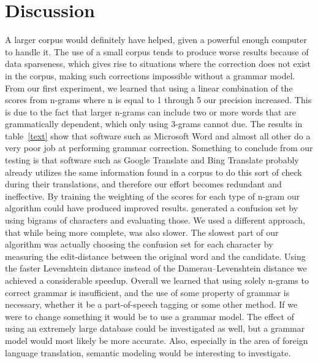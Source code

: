 \documentclass[twocolumn]{article}
\begin{document}
\section{Discussion}
A larger corpus would definitely have helped, given a powerful enough computer to handle it. The use of a small corpus tends to produce worse results because of data sparseness, which gives rise to situations where the correction does not exist in the corpus, making such corrections impossible without a grammar model. From our first experiment, we learned that using a linear combination of the scores from n-grams where n is equal to 1 through 5 our precision increased. This is due to the fact that larger n-grams can include two or more words that are grammatically dependent, which only using 3-grams cannot due. 
The results in table~\ref{text} show that software such as Microsoft Word and almost all other do a very poor job at performing grammar correction.
Something to conclude from our testing is that software such as Google Translate and Bing Translate probably already utilizes the same information found in a corpus to do this sort of check during their translations, and therefore our effort becomes redundant and ineffective.
By training the weighting of the scores for each type of n-gram our algorithm could have produced improved results.
\cite{Bassil12} generated a confusion set by using bigrams of characters and evaluating those. We used a different approach, that while being more complete, was also slower. The slowest part of our algorithm was actually choosing the confusion set for each character by measuring the edit-distance between the original word and the candidate. Using the faster Levenshtein distance instead of the Damerau–Levenshtein distance we achieved a considerable speedup. Overall we learned that using solely n-grams to correct grammar is insufficient, and the use of some property of grammar is necessary, whether it be a part-of-speech tagging or some other method. If we were to change something it would be to use a grammar model. The effect of using an extremely large database could be investigated as well, but a grammar model would most likely be more accurate. Also, especially in the area of foreign language translation, semantic modeling would be interesting to investigate.

\begin{spacing}{0.9}
\small

\end{spacing}
\end{document}
